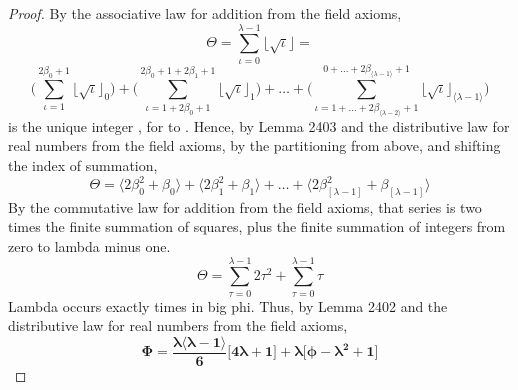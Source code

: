 \documentclass[preview]{standalone}
\begin{document}
\begin{proof}
    By the associative law for addition from the field axioms,
    \begin{equation*}
        \Theta
            = 
        \sum_{\iota=0}^{\lambda - 1} 
                \big \lfloor \sqrt \iota \big \rfloor 
            =
    \end{equation*}
    \begin{equation*}
        \Bigg (
            \sum_{\iota=1}^{ 2 \beta_0 + 1 } 
                    \big \lfloor \sqrt \iota \big \rfloor_0 
        \Bigg )
            +
        \Bigg (
            \sum_{\iota=1 + 2 \beta_0 + 1}^{ 2 \beta_0 + 1 + 2 \beta_1 + 1 } 
                    \big \lfloor \sqrt \iota \big \rfloor_1 
        \Bigg )
            +
        \dots
            +
        \Bigg (
            \sum_{\iota=1 +  \dots + 2 \beta_{\langle \lambda - 2 \rangle} + 1 }
                ^{0 + \dots + 2 \beta_{\langle \lambda - 1 \rangle} + 1} 
                    \big \lfloor \sqrt \iota \big \rfloor_{
                        \langle \lambda - 1 \rangle
                    } 
        \Bigg )
    \end{equation*}
    \bm{$\big \lfloor \sqrt \iota \big \rfloor_\tau$}
    is the unique integer \bm{$\beta_\tau$}, 
    for  to \bm{$\big \langle \lambda - 1 \big \rangle$}.
    Hence, by Lemma 2403 and the distributive law for real numbers from the field axioms, 
    by the partitioning from above, and shifting the index of summation,
    \begin{equation*}
        \Theta
            =
        \Big \langle 2 \beta_{0} ^2 + \beta_0 \Big \rangle
            +
        \Big \langle 2 \beta_{1} ^2 + \beta_1 \Big \rangle
            +
        \dots
            +
        \Big \langle 
            2 \beta_{[ \lambda - 1 ]} ^2
                +
            \beta_{[ \lambda - 1 ]}
        \Big \rangle
    \end{equation*}
    By the commutative law for addition from the field axioms,
    that series is two times the finite summation of squares, 
    plus the finite summation of integers from zero to lambda minus one.
    \begin{equation*}
        \Theta
            = 
        \sum_{\tau=0}^{ \lambda - 1 } 2 \tau ^2 
            +
        \sum_{\tau=0}^{ \lambda - 1 } \tau
    \end{equation*}
    Lambda occurs exactly 
    times in big phi.
    Thus, by Lemma 2402 and the distributive law for real numbers from the field axioms,
    \begin{equation*}
        \bm{
            \Phi
                =
            \frac{
                \lambda
                \big \langle \lambda - 1 \big \rangle
            }
            {6}
            \Bigg[
                4 \lambda + 1
            \Bigg]
                +
            \lambda
            \Bigg[
                \phi
                    -
                \lambda ^2
                    +
                1
            \Bigg]
        }
    \end{equation*}
\end{proof}
\end{document}
